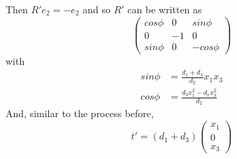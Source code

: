 \documentclass{article}
\begin{document}
\noindent
Then $R' e_2 = -e_2$ and so $R'$ can be written as
%
\begin {equation}
\begin {pmatrix}
cos \phi &  0 &  sin \phi \\
0        & -1 &  0        \\
sin \phi &  0 & -cos \phi
\end {pmatrix}
\end {equation}
%
with
%
\begin {equation}
\begin {aligned}
sin \phi &= \frac {d_1 + d_3} {d_2} x_1 x_3 \\
cos \phi &= \frac {d_3 x_1^2 - d_1 x_3^2} {d_2}
\end {aligned}
\end {equation}
%
And, similar to the process before,
%
\begin {equation}
t' = (d_1 + d_3)
\begin {pmatrix}
x_1 \\
0 \\
x_3
\end {pmatrix}
\end {equation}
%
\end{document}

